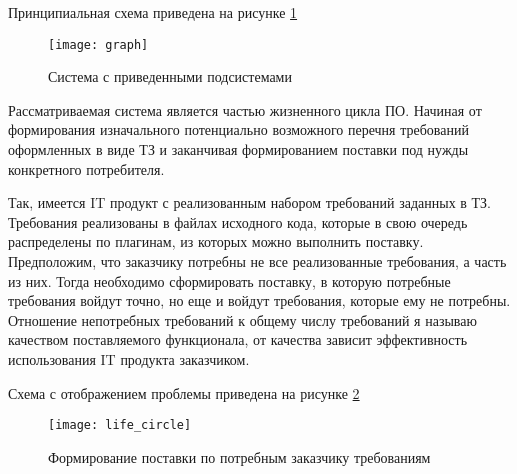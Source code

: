Принципиальная схема приведена на рисунке \ref{fig:graph}

\begin{figure}[H]
    \centering
    \texttt{[image: graph]}
    \caption{Система с приведенными подсистемами}
    \label{fig:graph}
\end{figure}

Рассматриваемая система является частью жизненного цикла ПО. Начиная от формирования изначального потенциально возможного перечня требований оформленных в виде ТЗ и заканчивая формированием поставки под нужды конкретного потребителя.

Так, имеется IT продукт с реализованным набором требований заданных в ТЗ. Требования реализованы в файлах исходного кода, которые в свою очередь распределены по плагинам, из которых можно выполнить поставку. Предположим, что заказчику потребны не все реализованные требования, а часть из них. Тогда необходимо сформировать поставку, в которую потребные требования войдут точно, но еще и войдут требования, которые ему не потребны. Отношение непотребных требований к общему числу требований я называю качеством поставляемого функционала, от качества зависит эффективность использования IT продукта заказчиком.

Схема с отображением проблемы приведена на рисунке \ref{fig:life_circle}

\begin{figure}[H]
    \centering
    \texttt{[image: life\_circle]}
    \caption{Формирование поставки по потребным заказчику требованиям}
    \label{fig:life_circle}
\end{figure}